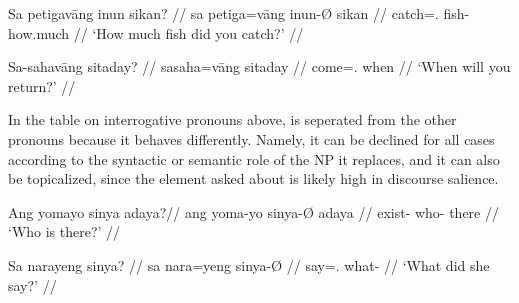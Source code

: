 \pex
\a\begingl
	\gla Sa petigavāng inun sikan? //
	\glb sa petiga=vāng inun-Ø sikan //
	\glc \PatT{} catch=\Ssg{}.\Aarg{} fish-\Top{} how.much //
	\glft `How much fish did you catch?' //
\endgl

\a\begingl
	\gla Sa-sahavāng sitaday? //
	\glb sa\til{}saha=vāng sitaday //
	\glc \Iter{}\til{}come=\Ssg{}.\Aarg{} when //
	\glft `When will you return?' //
\endgl
\xe

In the table on interrogative pronouns above,  is seperated from the other pronouns because it behaves differently.
Namely, it can be declined for all cases according to the syntactic or semantic
role of the NP it replaces, and it can also be topicalized, since the element
asked about is likely high in discourse salience.

\pex
\a\begingl
	\gla Ang yomayo sinya adaya?\footnotemark //
	\glb ang yoma-yo sinya-Ø adaya //
	\glc \AgtT{} exist-\TsgN{} who-\Top{} there //
	\glft `Who is there?' //
\endgl

\a\begingl
	\gla Sa narayeng sinya? //
	\glb sa nara=yeng sinya-Ø //
	\glc \PatT{} say=\TsgF{}.\Aarg{} what-\Top{} //
	\glft `What did she say?' //
\endgl

\xe


